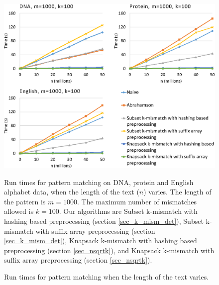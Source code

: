 \begin{figure}
\caption{Run times for pattern matching when the length of the text varies.}
\label{fig_runtimes_varyn} 
\includegraphics{fig1.eps}

Run times for pattern matching on DNA, protein and
English alphabet data, when the length of the text ($n$) varies.
The length of the pattern is $m=1000$. The maximum number of mismatches
allowed is $k=100$.
Our algorithms are Subset
k-mismatch with hashing based preprocessing (section
\ref{sec_k_mism_det}), Subset k-mismatch with suffix array preprocessing (section \ref{sec_k_mism_det}),
Knapsack k-mismatch with hashing based preprocessing (section
\ref{sec_nsqrtk}), and Knapsack k-mismatch with suffix array preprocessing (section
\ref{sec_nsqrtk}). 
\end{figure}



